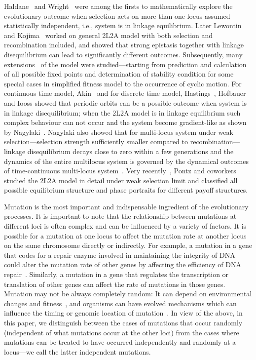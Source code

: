 \documentclass[
 pre,
 aps,
 a4paper,
 english,
 showkeys,
 reprint,
 twocolumn,
 superscriptaddress
]{revtex4}
\begin{document}
Haldane~{\cite{haldane1931mathematical}} and Wright~{\cite{wright1935Genetics}} were among the firsts to mathematically explore the evolutionary outcome when selection acts on more than one locus assumed statistically independent, i.e., system is in linkage equilibrium. Later Lewontin and Kojima~{\cite{lewontin1960evolution}} worked on general 2L2A model with both selection and recombination included, and showed that strong epistasis together with linkage disequilibrium can lead to significantly different outcomes. Subsequently, many extensions~{\cite{bodmer1967genetics, karlin1970TPB, feldman1979genetics, hastings1985genetics, ewens1968TAG}} of the model were studied---starting from prediction and calculation of all possible fixed points  and determination of stability condition for some special cases in simplified fitness model to the occurrence of cyclic motion. For continuous time model, Akin~{\cite{akin1982JMB}} and for discrete time model, Hastings~{\cite{hastings1981PNAS}}, Hofbauer and Iooss {\cite{hofbauer1984Mathematik}} showed that periodic orbits can be a possible outcome when system is in linkage disequilibrium; when the 2L2A model is in linkage equilibrium such complex behaviour can not occur and the system become gradient-like as shown by Nagylaki~{\cite{nagylaki1989Genetics}}. Nagylaki also showed that for multi-locus system under weak selection---selection  strength sufficiently smaller compared to recombination---linkage disequilibrium decays close to zero within a few generations and the dynamics of the entire multilocus system is governed by the dynamical outcomes of time-continuous multi-locus system~\cite{nagylaki1993Genetics,nagylaki1999JMB,nagylaki2013book}. Very recently~{\cite{pontz2018JMB}}, Pontz and coworkers studied the 2L2A model in detail under weak selection limit and classified all possible equilibrium structure and phase portraits for different payoff structures.      

Mutation is the most important and indispensable ingredient of the evolutionary processes. It is important to note that the relationship between mutations at different loci is often complex and can be influenced by a variety of factors. It is possible for a mutation at one locus to affect the mutation rate at another locus on the same chromosome \cite{Nowak2004pnas,Li2013nb} directly or indirectly.  For example, a mutation in a gene that codes for a repair enzyme involved in maintaining the integrity of DNA could alter the mutation rate of other genes by affecting the efficiency of DNA repair~\cite{Steele1998bjs}. Similarly, a mutation in a gene that regulates the transcription or translation of other genes can affect the rate of mutations in those genes. Mutation may not be always completely random: It can depend on environmental changes \cite{Galhardo2007crbmb} and fitness~\cite{Baer2008plos}, and organisms can have evolved mechanisms which can influence the timing or genomic location of mutation~\cite{Rando2007cell}. In view of the above, in this paper, we distinguish between the cases of mutations that occur randomly (independent of what mutations occur at the other loci) from the cases where mutations can be treated to have occurred independently and randomly at a locus---we call the latter independent mutations.
\end{document}
